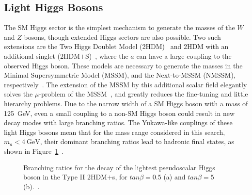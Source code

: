 \documentclass[NOTE, atlasdraft=true, texlive=2017, UKenglish]{\ATLASLATEXPATH atlasdoc}
\begin{document}
\subsection{Light Higgs Bosons}
\label{sec:introa0}

The SM Higgs sector is the simplest mechanism to generate the masses of the $W$ and $Z$ bosons, though extended Higgs sectors are also possible. Two such extensions are the Two Higgs Doublet Model (2HDM)~\cite{PhysRevD.90.075004} and 2HDM with an additional singlet (2HDM$+$S)~\cite{PhysRevD.90.075004,a0}, where the $a$ can have a large coupling to the observed Higgs boson. These models are necessary to generate the masses in the Minimal Supersymmetric Model (MSSM), and the Next-to-MSSM (NMSSM), respectively~\cite{Gunion:2002zf}. The extension of the MSSM by this additional scalar field elegantly solves the $\mu$-problem of the MSSM~\cite{Babu:2001gp}, and greatly reduces the fine-tuning and little hierarchy problems. Due to the narrow width of a SM Higgs boson with a mass of 125~GeV, even a small coupling to a non-SM Higgs boson could result in new decay modes with large branching ratios. The Yukawa-like couplings of these light Higgs bosons mean that for the mass range considered in this search, $m_{a}<4~\text{GeV}$, their dominant branching ratios lead to hadronic final states, as shown in Figure~\ref{fig:a0brs}~\cite{Curtin:2013fra}.

\begin{figure}[!htbp]
  \centering
  \caption{Branching ratios for the decay of the lightest pseudoscalar Higgs boson in the Type II 2HDM$+$s, for $tan\beta=0.5$ (a) and  $tan\beta=5$ (b).~\cite{Curtin:2013fra}.}
  \label{fig:a0brs}
\end{figure}
\end{document}
